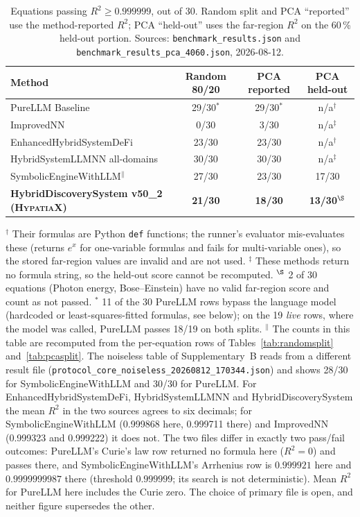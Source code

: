 \documentclass[twoside,11pt]{article}
\newcommand{\Rsq}{R^{2}}
\begin{document}
\begin{table}[h]
\centering
\caption{Equations passing $\Rsq \geq 0.999999$, out of 30. Random split and PCA ``reported'' use the
  method-reported $\Rsq$; PCA ``held-out'' uses the far-region $\Rsq$ on the 60\,\% held-out portion.
  Sources: \texttt{benchmark\_results.json} and \texttt{benchmark\_results\_pca\_4060.json}, 2026-08-12.}
\label{tab:feynman30-methods}
\small
\begin{tabular}{lccc}
\toprule
Method & Random 80/20 & PCA reported & PCA held-out \\
\midrule
PureLLM Baseline & 29/30$^\ast$ & 29/30$^\ast$ & n/a$^\dagger$ \\
ImprovedNN & 0/30 & 3/30 & n/a$^\ddagger$ \\
EnhancedHybridSystemDeFi & 23/30 & 23/30 & n/a$^\dagger$ \\
HybridSystemLLMNN all-domains & 30/30 & 30/30 & n/a$^\ddagger$ \\
SymbolicEngineWithLLM$^\parallel$ & 27/30 & 23/30 & 17/30 \\
\textbf{HybridDiscoverySystem v50\_2 (\textsc{HypatiaX})} & \textbf{21/30} & \textbf{18/30} & \textbf{13/30}$^\S$ \\
\bottomrule
\end{tabular}

{\footnotesize $^\dagger$ Their formulas are Python \texttt{def} functions; the runner's evaluator
mis-evaluates these (returns $e^{x}$ for one-variable formulas and fails for multi-variable ones), so the
stored far-region values are invalid and are not used. $^\ddagger$ These methods return no formula string, so the held-out score cannot be recomputed.
$^\S$ 2 of 30 equations (Photon energy, Bose--Einstein) have no valid far-region score and count as not passed.
$^\ast$ 11 of the 30 PureLLM rows bypass the language model (hardcoded or least-squares-fitted formulas, see below); on the 19 \emph{live} rows, where the model was called, PureLLM passes 18/19 on both splits.
$^\parallel$ The counts in this table are recomputed from the per-equation rows of Tables~\ref{tab:randomsplit} and~\ref{tab:pcasplit}. The noiseless table of Supplementary~B reads from a different result file (\texttt{protocol\_core\_noiseless\_20260812\_170344.json}) and shows 28/30 for SymbolicEngineWithLLM and 30/30 for PureLLM. For EnhancedHybridSystemDeFi, HybridSystemLLMNN and HybridDiscoverySystem the mean $\Rsq$ in the two sources agrees to six decimals; for SymbolicEngineWithLLM (0.999868 here, 0.999711 there) and ImprovedNN (0.999323 and 0.999222) it does not. The two files differ in exactly two pass/fail outcomes: PureLLM's Curie's law row returned no formula here ($\Rsq=0$) and passes there, and SymbolicEngineWithLLM's Arrhenius row is $0.999921$ here and $0.9999999987$ there (threshold $0.999999$; its search is not deterministic). Mean $\Rsq$ for PureLLM here includes the Curie zero. The choice of primary file is open, and neither figure supersedes the other.}
\end{table}
\end{document}
